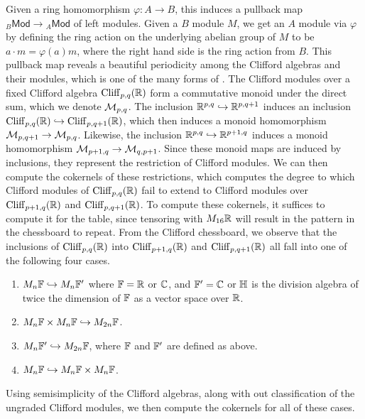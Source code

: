 Given a ring homomorphism $\varphi : A \to B$, this induces a pullback map
${}_B\mathsf{Mod} \to {}_A\mathsf{Mod}$ of left modules. Given a $B$ module $M$,
we get an $A$ module via $\varphi$ by defining the ring action on the underlying
abelian group of $M$ to be $a \cdot m = \varphi(a)m$, where the right hand side
is the ring action from $B$. This pullback map reveals a beautiful periodicity
among the Clifford algebras and their modules, which is one of the many forms
of . The Clifford modules over a fixed Clifford algebra
$\operatorname{Cliff}_{p,q}(\mathbb{R})$ form a commutative monoid under the direct sum, which
we denote $\mathcal{M}_{p,q}$. The inclusion $\mathbb{R}^{p,q} \hookrightarrow \mathbb{R}^{p,q+1}$ induces
an inclusion $\operatorname{Cliff}_{p,q}(\mathbb{R}) \hookrightarrow \operatorname{Cliff}_{p,q+1}(\mathbb{R})$, which then
induces a monoid homomorphism $\mathcal{M}_{p,q+1} \to \mathcal{M}_{p,q}$. Likewise, the inclusion
$\mathbb{R}^{p,q}\hookrightarrow \mathbb{R}^{p+1,q}$ induces a monoid homomorphism
$\mathcal{M}_{p+1,q} \to \mathcal{M}_{q,p+1}$. Since these monoid maps are induced by
inclusions, they represent the restriction of Clifford modules. We can then
compute the cokernels of these restrictions, which computes the degree to
which Clifford modules of $\operatorname{Cliff}_{p,q}(\mathbb{R})$ fail to extend to Clifford modules
over $\operatorname{Cliff}_{p+1,q}(\mathbb{R})$ and $\operatorname{Cliff}_{p,q+1}(\mathbb{R})$. To compute these cokernels,
it suffices to compute it for the table, since tensoring with $M_{16}\mathbb{R}$ will
result in the pattern in the chessboard to repeat. From the Clifford chessboard,
we observe that the inclusions of $\operatorname{Cliff}_{p,q}(\mathbb{R})$ into $\operatorname{Cliff}_{p+1,q}(\mathbb{R})$
and $\operatorname{Cliff}_{p,q+1}(\mathbb{R})$ all fall into one of the following four cases.
%
\begin{enumerate}
 \item $M_n\mathbb{F} \hookrightarrow M_n\mathbb{F}'$ where $\mathbb{F} = \mathbb{R}$ or $\mathbb{C}$, and $\mathbb{F}' = \mathbb{C}$
       or $\mathbb{H}$ is the division algebra of twice the dimension of $\mathbb{F}$ as a
       vector space over $\mathbb{R}$.
 \item $M_n\mathbb{F} \times M_n\mathbb{F} \hookrightarrow M_{2n}\mathbb{F}$.
 \item $M_n\mathbb{F}' \hookrightarrow M_{2n}\mathbb{F}$, where $\mathbb{F}$ and $\mathbb{F}'$ are defined as above.
 \item $M_n\mathbb{F} \hookrightarrow M_n\mathbb{F} \times M_n\mathbb{F}$.
\end{enumerate}
%
Using semisimplicity of the Clifford algebras, along with out classification of
the ungraded Clifford modules, we then compute the cokernels for all of these
cases.
%
